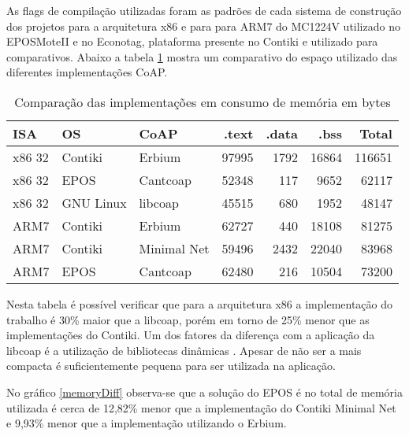 As flags de compila\c{c}\~ao utilizadas foram as padr\~oes de cada sistema de constru\c{c}\~ao dos projetos para a arquitetura x86 e para para ARM7 do MC1224V utilizado no EPOSMoteII e no Econotag, plataforma presente no Contiki e utilizado para comparativos. Abaixo a tabela \ref{comparacaoCoap} mostra um comparativo do espa\c{c}o utilizado das diferentes implementa\c{c}\~oes CoAP.

\begin{table}[H]
\label{comparacaoCoap}
\centering
\begin{tabular}{@{}p{1cm}p{1cm}p{1cm}r{1cm}r{1cm}r{1cm}r{1cm}@{}}
    \toprule
    ISA & OS & CoAP & .text & .data & .bss & Total\\ \midrule
    x86 32& Contiki & Erbium & 97995 & 1792 & 16864 & 116651 \\
    x86 32& EPOS & Cantcoap & 52348 & 117 & 9652 & 62117 \\
    x86 32& GNU Linux & libcoap & 45515 & 680 & 1952 & 48147\\ \hline
    ARM7 & Contiki & Erbium & 62727 & 440 & 18108 & 81275\\
    ARM7 & Contiki & Minimal Net & 59496 & 2432 & 22040 & 83968\\
    ARM7 & EPOS & Cantcoap & 62480 & 216 & 10504 & 73200\\
    \bottomrule
\end{tabular}
\caption{Compara\c{c}\~ao das implementa\c{c}\~oes em consumo de mem\'oria em bytes}
\end{table}

Nesta tabela \'e poss\'ivel verificar que para a arquitetura x86 a implementa\c{c}\~ao do trabalho \'e 30\% maior que a libcoap, por\'em em torno de 25\% menor que as implementa\c{c}\~oes do Contiki. Um dos fatores da diferen\c{c}a com a aplica\c{c}\~ao da libcoap \'e a utiliza\c{c}\~ao de bibliotecas din\^amicas \cite{ibmCodeSize}. Apesar de n\~ao ser a mais compacta \'e suficientemente pequena para ser utilizada na aplica\c{c}\~ao.

No gr\'afico \ref{memoryDiff} observa-se que a solu\c{c}\~ao do EPOS \'e no total de mem\'oria utilizada \'e cerca de 12,82\% menor que a implementa\c{c}\~ao do Contiki Minimal Net e 9,93\% menor que a implementa\c{c}\~ao utilizando o Erbium.

